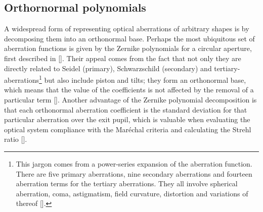 \begin{refsection}
\subsection{Orthornormal polynomials}

A widespread form of representing optical aberrations of arbitrary shapes is by decomposing them into an orthonormal base. Perhaps the most ubiquitous set of aberration functions is given by the Zernike polynomials for a circular aperture, first described in [\cite{Zernike1934}]. Their appeal comes from the fact that not only they are directly related to Seidel (primary), Schwarzschild (secondary) and tertiary-aberrations\footnote{This jargon comes from a power-series expansion of the aberration function. There are five primary aberrations, nine secondary aberrations and fourteen aberration terms for the tertiary aberrations. They all involve spherical aberration, coma, astigmatism, field
curvature, distortion and variations of thereof [\cite{Mahajan2013}].} but also include piston and tilts; they form an orthonormal base, which means that the value of the coefficients is not affected by the removal of a particular term [\cite{Mahajan2007}]. Another advantage of the Zernike polynomial decomposition is that each orthonormal aberration coefficient is the standard deviation for that particular aberration over the exit pupil, which is valuable when evaluating the optical system compliance with the  Mar\'echal criteria and calculating the Strehl ratio [\cite{Mahajan1983}].


\end{refsection}
